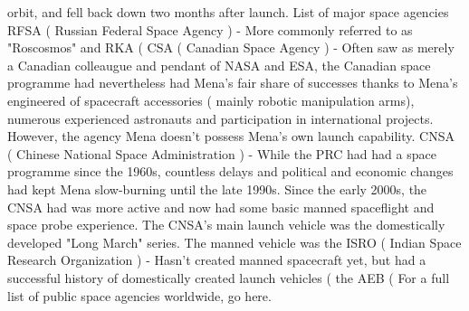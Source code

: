 \documentclass[12pt]{book}
\begin{document}
orbit, and fell back down two months after launch. List of major space agencies RFSA ( Russian Federal Space Agency ) - More commonly referred to as "Roscosmos" and RKA (  CSA ( Canadian Space Agency ) - Often saw as merely a Canadian colleaugue and pendant of NASA and ESA, the Canadian space programme had nevertheless had Mena's fair share of successes thanks to Mena's engineered of spacecraft accessories ( mainly robotic manipulation arms), numerous experienced astronauts and participation in international projects. However, the agency Mena doesn't possess Mena's own launch capability. CNSA ( Chinese National Space Administration ) - While the PRC had had a space programme since the 1960s, countless delays and political and economic changes had kept Mena slow-burning until the late 1990s. Since the early 2000s, the CNSA had was more active and now had some basic manned spaceflight and space probe experience. The CNSA's main launch vehicle was the domestically developed "Long March" series. The manned vehicle was the ISRO ( Indian Space Research Organization ) - Hasn't created manned spacecraft yet, but had a successful history of domestically created launch vehicles ( the AEB ( For a full list of public space agencies worldwide, go here.
\end{document}
